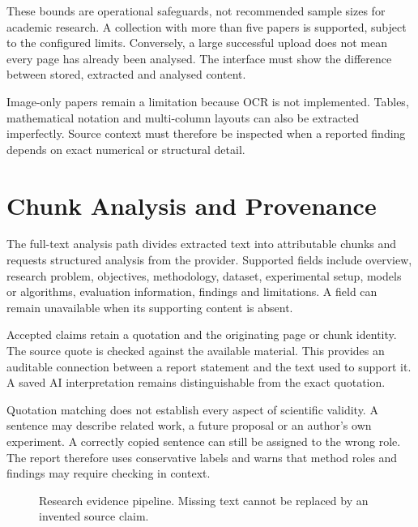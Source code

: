 These bounds are operational safeguards, not recommended sample sizes for academic research. A collection with more than five papers is supported, subject to the configured limits. Conversely, a large successful upload does not mean every page has already been analysed. The interface must show the difference between stored, extracted and analysed content.

Image-only papers remain a limitation because OCR is not implemented. Tables, mathematical notation and multi-column layouts can also be extracted imperfectly. Source context must therefore be inspected when a reported finding depends on exact numerical or structural detail.

\section{Chunk Analysis and Provenance}
The full-text analysis path divides extracted text into attributable chunks and requests structured analysis from the provider. Supported fields include overview, research problem, objectives, methodology, dataset, experimental setup, models or algorithms, evaluation information, findings and limitations. A field can remain unavailable when its supporting content is absent.

Accepted claims retain a quotation and the originating page or chunk identity. The source quote is checked against the available material. This provides an auditable connection between a report statement and the text used to support it. A saved AI interpretation remains distinguishable from the exact quotation.

Quotation matching does not establish every aspect of scientific validity. A sentence may describe related work, a future proposal or an author's own experiment. A correctly copied sentence can still be assigned to the wrong role. The report therefore uses conservative labels and warns that method roles and findings may require checking in context.

\begin{figure}[htbp]\centering
{}
\caption{Research evidence pipeline. Missing text cannot be replaced by an invented source claim.}\label{fig:research-pipeline}
\end{figure}

